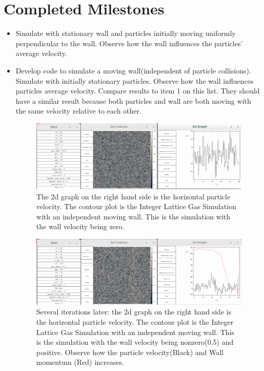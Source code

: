 \documentclass{article}
\begin{document}
\section{Completed Milestones}
\begin{itemize}
  \item Simulate with stationary wall and particles initially moving uniformly perpendicular to the wall. Observe how the wall influences the particles' average velocity.
 
  \item Develop code to simulate a moving wall(independent of particle collisions). Simulate with initially stationary particles. Observe how the wall influences particles average velocity. Compare results to item 1 on this list. They should have a similar result because both particles and wall are both moving with the same velocity relative to each other.
\begin{figure}

\includegraphics[scale=0.2]{ms1p0.png}
\caption{\label{fig} The 2d graph on the right hand side is the horizontal particle velocity. The contour plot is the Integer Lattice Gas Simulation with an independent moving wall. This is the simulation with the wall velocity being zero.}
\end{figure} 

\begin{figure}

\includegraphics[scale=0.2]{ms1p1.png}
\caption{\label{fig} Several iterations later: the 2d graph on the right hand side is the horizontal particle velocity. The contour plot is the Integer Lattice Gas Simulation with an independent moving wall. This is the simulation with the wall velocity being nonzero(0.5) and positive. Observe how the particle velocity(Black) and Wall momentum (Red) increases.}
\end{figure}


\end{itemize}
\end{document}
